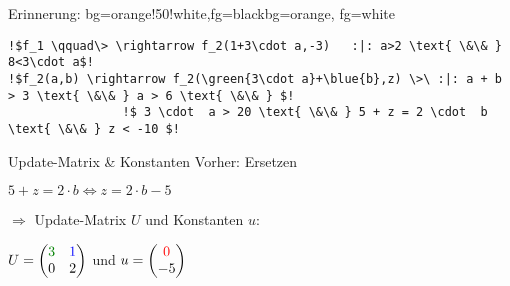 \begin{frame}[fragile]
	\begin{variableblock}{Erinnerung: \its}{bg=orange!50!white,fg=black}{bg=orange, fg=white}
		\begin{lstlisting}[linewidth=10.5cm, escapechar = !]
!$f_1 \qquad\> \rightarrow f_2(1+3\cdot a,-3)   :|: a>2 \text{ \&\& } 8<3\cdot a$!
!$f_2(a,b) \rightarrow f_2(\green{3\cdot a}+\blue{b},z) \>\ :|: a + b > 3 \text{ \&\& } a > 6 \text{ \&\& } $!
				!$ 3 \cdot  a > 20 \text{ \&\& } 5 + z = 2 \cdot  b \text{ \&\& } z < -10 $!
		\end{lstlisting}
	\end{variableblock}
		\begin{exampleblock}{Update-Matrix \& Konstanten}
			Vorher: Ersetzen
			\begin{center}
				$5+z=2\cdot b \Leftrightarrow z=2\cdot b - 5$
			\end{center}
			$\Rightarrow$ Update-Matrix $U$ und Konstanten $u$:\newline
			\begin{center}
				\vspace{-2em}
				$U = \begin{pmatrix} \green{3} & \blue{1} \\ 0 & 2 \end{pmatrix}$ und $u = \begin{pmatrix} \color{red}0\color{black} \\ -5 \end{pmatrix}$
			\end{center}		
		\end{exampleblock}
\end{frame}

